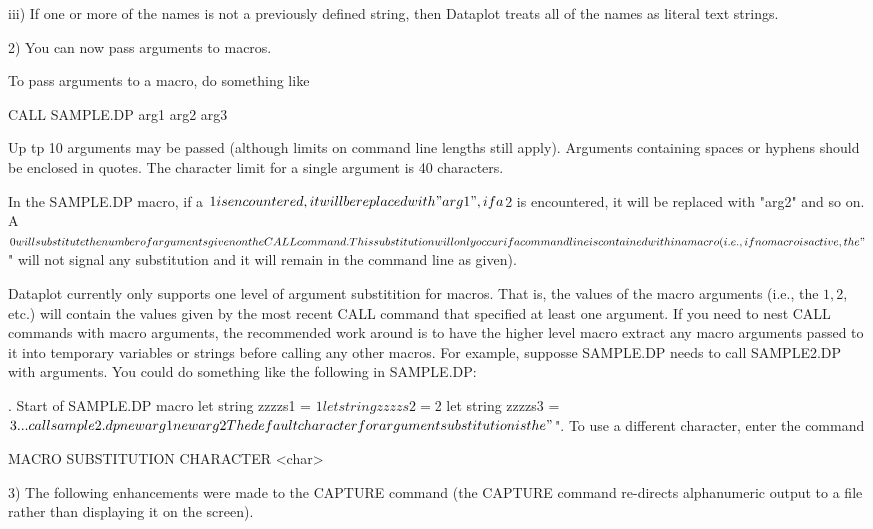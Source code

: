 {       iii) If one or more of the names is not a previously
            defined string, then Dataplot treats all of the
            names as literal text strings.

 2) You can now pass arguments to macros.

    To pass arguments to a macro, do something like

        CALL SAMPLE.DP  arg1  arg2 arg3

    Up tp 10 arguments may be passed (although limits on command
    line lengths still apply).  Arguments containing spaces or
    hyphens should be enclosed in quotes.  The character limit for
    a single argument is 40 characters.

    In the SAMPLE.DP macro, if a $1 is encountered, it will be
    replaced with "arg1", if a $2 is encountered, it will be
    replaced with "arg2" and so on.  A $0 will substitute the
    number of arguments given on the CALL command.

    This substitution will only occur if a command line is contained
    within a macro (i.e., if no macro is active, the "$" will not
    signal any substitution and it will remain in the command line
    as given).

    Dataplot currently only supports one level of argument
    substitition for macros.  That is, the values of the macro
    arguments (i.e., the $1, $2, etc.) will contain the values
    given by the most recent CALL command that specified at least
    one argument.  If you need to nest CALL commands with macro
    arguments, the recommended work around is to have the
    higher level macro extract any macro arguments passed to it
    into temporary variables or strings before calling any other
    macros.  For example, supposse SAMPLE.DP needs to call
    SAMPLE2.DP with arguments.  You could do something like
    the following in SAMPLE.DP:

        .  Start of SAMPLE.DP macro
        let string zzzzs1 = $1
        let string zzzzs2 = $2
        let string zzzzs3 = $3
            ...
        call sample2.dp  newarg1  newarg2

    The default character for argument substitution is the
    "$".  To use a different character, enter the command

       MACRO SUBSTITUTION CHARACTER <char>

 3) The following enhancements were made to the CAPTURE
    command (the CAPTURE command re-directs alphanumeric output
    to a file rather than displaying it on the screen).

}
